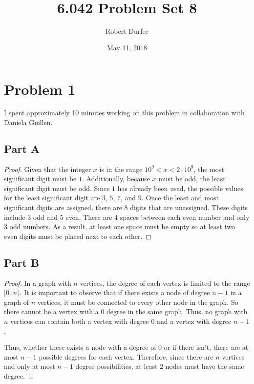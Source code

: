 \documentclass{article}
\title{6.042 Problem Set 8}
\author{Robert Durfee}
\date{May 11, 2018}
\begin{document}
\maketitle

\section*{Problem 1}

I spent approximately 10 minutes working on this problem in collaboration with
Daniela Guillen.

\subsection*{Part A}

\begin{proof}

  Given that the integer $x$ is in the range $10^9 < x < 2 \cdot 10^9$, the most
  significant digit must be $1$. Additionally, because $x$ must be odd, the
  least significant digit must be odd. Since $1$ has already been used,
  the possible values for the least significant digit are $3$, $5$, $7$, and
  $9$. Once the least and most significant digits are assigned, there are 8
  digits that are unassigned. These digits include $3$ odd and $5$ even. There
  are 4 spaces between each even number and only 3 odd numbers. As a
  result, at least one space must be empty so at least two even digits must be
  placed next to each other.

\end{proof}

\break

\subsection*{Part B}

\begin{proof}

  In a graph with $n$ vertices, the degree of each vertex is limited to the
  range $[0..n)$. It is important to observe that if there exists a node of
  degree $n-1$ in a graph of $n$ vertices, it must be connected to every other
  node in the graph. So there cannot be a vertex with a $0$ degree in the
  same graph. Thus, no graph with $n$ vertices can contain both a vertex
  with degree $0$ and a vertex with degree $n-1$.

  Thus, whether there exists a node with a degree of $0$ or if there isn't,
  there are at most $n - 1$ possible degrees for each vertex. Therefore, since
  there are $n$ vertices and only at most $n - 1$ degree possibilities, at least
  $2$ nodes must have the same degree.

\end{proof}
\end{document}
